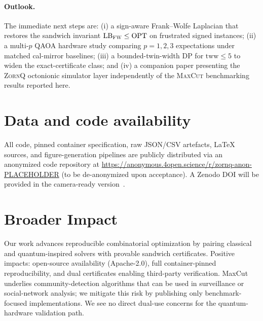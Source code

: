 \documentclass{article}
\theoremstyle{definition}
\theoremstyle{remark}
\newcommand{\MaxCut}{\textsc{MaxCut}\xspace}
\newcommand{\ZornQ}{\textsc{ZornQ}\xspace}
\newcommand{\QAOA}{\textsc{QAOA}\xspace}
\newcommand{\FW}{\textsc{FW}\xspace}
\newcommand{\OPT}{\mathrm{OPT}}
\newcommand{\LB}{\mathrm{LB}}
\newcommand{\tww}{\mathrm{tww}}
\begin{document}
\paragraph{Outlook.} The immediate next steps are: (i) a sign-aware
Frank--Wolfe Laplacian that restores the sandwich invariant
$\LB_{\FW} \le \OPT$ on frustrated signed instances; (ii) a multi-$p$
\QAOA hardware study comparing $p = 1, 2, 3$ expectations under matched
cal-mirror baselines; (iii) a bounded-twin-width DP for $\tww \le 5$
to widen the exact-certificate class; and (iv) a companion paper
presenting the \ZornQ octonionic simulator layer independently of the
\MaxCut benchmarking results reported here.

\section*{Data and code availability}

\begin{sloppypar}
All code, pinned container specification, raw JSON/CSV artefacts,
LaTeX sources, and figure-generation pipelines are publicly
distributed via an anonymized code repository at
\url{https://anonymous.4open.science/r/zornq-anon-PLACEHOLDER}
(to be de-anonymized upon acceptance). A Zenodo DOI will be
provided in the camera-ready version~\cite{zornq2026code}.
\end{sloppypar}

\section*{Broader Impact}
\label{sec:broader_impact}
Our work advances reproducible combinatorial optimization by pairing
classical and quantum-inspired solvers with provable sandwich
certificates. Positive impacts: open-source availability (Apache-2.0),
full container-pinned reproducibility, and dual certificates enabling
third-party verification. MaxCut underlies community-detection
algorithms that can be used in surveillance or social-network
analysis; we mitigate this risk by publishing only benchmark-focused
implementations. We see no direct dual-use concerns for the
quantum-hardware validation path.

\printbibliography


\end{document}
